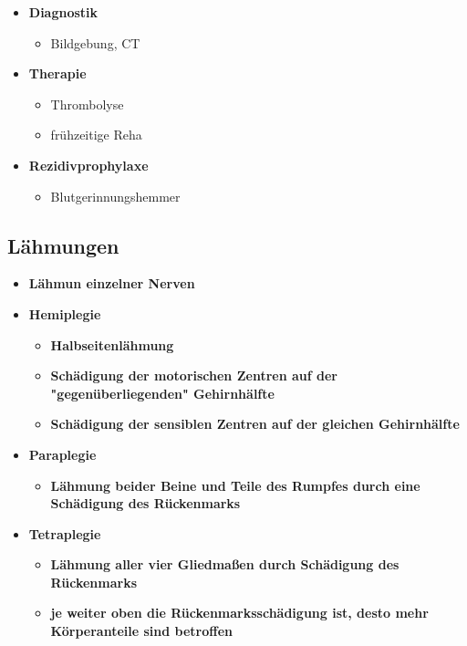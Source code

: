 \begin{itemize}
		\item \textbf{Diagnostik}
			\begin{itemize}
				\item Bildgebung, CT
			\end{itemize}
		\item \textbf{Therapie}
			\begin{itemize}
				\item Thrombolyse
				\item frühzeitige Reha
			\end{itemize}
		\item \textbf{Rezidivprophylaxe}
			\begin{itemize}
				\item Blutgerinnungshemmer
			\end{itemize}
	\end{itemize}
	
\subsection{Lähmungen}
	\begin{itemize}
		\item \textbf{Lähmun einzelner Nerven}
		\item \textbf{Hemiplegie}
			\begin{itemize}
				\item \textbf{Halbseitenlähmung}
				\item \textbf{Schädigung der motorischen Zentren auf der "gegenüberliegenden" Gehirnhälfte}
				\item \textbf{Schädigung der sensiblen Zentren auf der gleichen Gehirnhälfte}
			\end{itemize}
		\item \textbf{Paraplegie}
			\begin{itemize}
				\item \textbf{Lähmung beider Beine und Teile des Rumpfes durch eine Schädigung des Rückenmarks}
			\end{itemize}
		\item \textbf{Tetraplegie}
			\begin{itemize}
				\item \textbf{Lähmung aller vier Gliedmaßen durch Schädigung des Rückenmarks}
				\item \textbf{je weiter oben die Rückenmarksschädigung ist, desto mehr Körperanteile sind betroffen}
			\end{itemize}
	\end{itemize}
	
